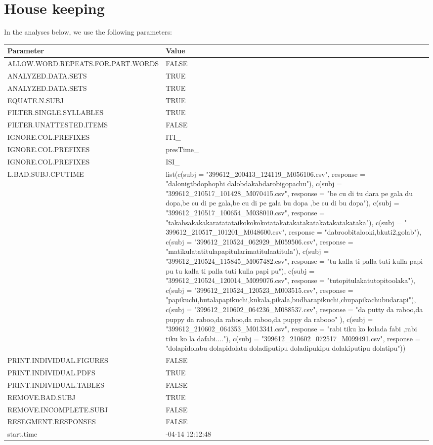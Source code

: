 \documentclass[
]{article}
\begin{document}
\hypertarget{house-keeping}{%
\section{House keeping}\label{house-keeping}}

In the analyses below, we use the following parameters:

\begin{tabular}{>{\raggedright\arraybackslash}p{20em}|>{\raggedright\arraybackslash}p{30em}}
\hline
Parameter & Value\\
\hline
ALLOW.WORD.REPEATS.FOR.PART.WORDS & FALSE\\
\hline
ANALYZED.DATA.SETS & \vphantom{1} TRUE\\
\hline
ANALYZED.DATA.SETS & TRUE\\
\hline
EQUATE.N.SUBJ & TRUE\\
\hline
FILTER.SINGLE.SYLLABLES & TRUE\\
\hline
FILTER.UNATTESTED.ITEMS & FALSE\\
\hline
IGNORE.COL.PREFIXES & ITI\_\\
\hline
IGNORE.COL.PREFIXES & presTime\_\\
\hline
IGNORE.COL.PREFIXES & ISI\_\\
\hline
L.BAD.SUBJ.CPUTIME & list(c(subj = "399612\_200413\_124119\_M056106.csv", response = "dalonigtbdophophi dalobdakabdarobigopachu"), c(subj = "399612\_210517\_101428\_M070415.csv", response = "be cu di tu dara pe gala du dopa,be cu di pe gala,be cu di pe gala bu dopa ,be cu di bu dopa"), c(subj = "399612\_210517\_100654\_M038010.csv", response = "takahsakakakaratatataikokokokotatakatakatakatakatakatakataka"), c(subj = " 399612\_210517\_101201\_M048600.csv", response = "dabroobitalooki,bkuti2,golab"), c(subj = "399612\_210524\_062929\_M059506.csv", 
response = "matikulatatitulapapitularimatitulaatitula"), c(subj = "399612\_210524\_115845\_M067482.csv", response = "tu kalla ti palla tuti kulla papi pu tu kalla ti palla tuti kulla papi pu"), c(subj = "399612\_210524\_120014\_M099076.csv", response = "tutopitulakatutopitoolaka"), c(subj = "399612\_210524\_120523\_M003515.csv", response = "papikuchi,butalapapikuchi,kukala,pikala,budharapikuchi,chupapikachubudarapi"), c(subj = "399612\_210602\_064236\_M088537.csv", response = "da putty da raboo,da puppy da raboo,da raboo,da raboo,da puppy da rabooo"
), c(subj = "399612\_210602\_064353\_M013341.csv", response = "rabi tiku ko kolada fabi ,rabi tiku ko la dafabi...."), c(subj = "399612\_210602\_072517\_M099491.csv", response = "dolapidolabu dolapidolatu doladiputipu doladipukipu dolakiputipu dolatipu"))\\
\hline
PRINT.INDIVIDUAL.FIGURES & FALSE\\
\hline
PRINT.INDIVIDUAL.PDFS & TRUE\\
\hline
PRINT.INDIVIDUAL.TABLES & FALSE\\
\hline
REMOVE.BAD.SUBJ & TRUE\\
\hline
REMOVE.INCOMPLETE.SUBJ & FALSE\\
\hline
RESEGMENT.RESPONSES & FALSE\\
\hline
start.time & 2022-04-14 12:12:48\\
\hline
\end{tabular}
\end{document}
